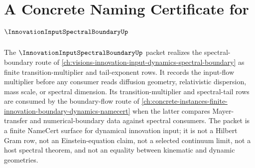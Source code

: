 \chapter{A Concrete Naming Certificate for $\InnovationInputSpectralBoundaryUp$}
\label{ch:concrete-instances-innovation-input-spectral-boundary-namecert}

The $\InnovationInputSpectralBoundaryUp$ packet realizes the spectral-boundary route of \autoref{ch:visions-innovation-input-dynamics-spectral-boundary} as finite transition-multiplier and tail-exponent rows. It records the input-flow multiplier before any consumer reads diffusion geometry, relativistic dispersion, mass scale, or spectral dimension. Its transition-multiplier and spectral-tail rows are consumed by the boundary-flow route of \autoref{ch:concrete-instances-finite-innovation-boundary-dynamics-namecert} when the latter compares Mayer-transfer and numerical-boundary data against spectral consumers. The packet is a finite NameCert surface for dynamical innovation input; it is not a Hilbert Gram row, not an Einstein-equation claim, not a selected continuum limit, not a host spectral theorem, and not an equality between kinematic and dynamic geometries.

